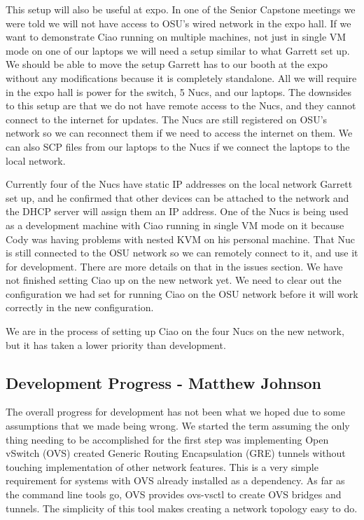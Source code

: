 \documentclass[10pt,onecolumn,journal,draftclsnofoot]{IEEEtran}
\begin{document}
This setup will also be useful at expo.
In one of the Senior Capstone meetings we were told  we will not have access to
OSU's wired network in the expo hall. If we want
to demonstrate Ciao running on multiple machines, not just in single VM mode on
one of our laptops we will need a setup similar to what Garrett set up.
We should be able to move the setup Garrett has to our booth at the expo
without any modifications because it is completely standalone. All we will
require in the expo hall is power for the switch, 5 Nucs, and our laptops.
The downsides to this setup are that we do not have remote access to the Nucs,
and they cannot connect to the internet for updates. The Nucs are still
registered on OSU's network so we can reconnect them if we need to access the
internet on them. We can also SCP files from our laptops to the Nucs if we
connect the laptops to the local network.

Currently four of the Nucs have static IP addresses on the local network Garrett
set up, and he confirmed that other devices can be attached to the network and
the DHCP server will assign them an IP address. One of the Nucs is being used 
as a development machine with Ciao running in single VM mode on it because Cody
was having problems with nested KVM on his personal machine. That Nuc is still 
connected to the OSU network so we can remotely connect to it, and use it for 
development.
There are more details on that in the issues section.
We have not finished setting Ciao up on the new network yet. We need to
clear out the configuration we had set for running Ciao on the OSU network
before it will work correctly in the new configuration.

We are in the process of setting up Ciao on the four Nucs on the  new network,
but it has taken a lower priority than development.

\subsection{Development Progress - Matthew Johnson}

The overall progress for development has not been what we hoped due to some
assumptions that we made being wrong. We started the term assuming the only
thing needing to be accomplished for the first step was implementing Open
vSwitch (OVS) created Generic Routing Encapsulation (GRE) tunnels without
touching implementation of other network features. This is a very simple
requirement for systems with OVS already installed as a dependency. As far as
the command line tools go, OVS provides ovs-vsctl to create OVS bridges and
tunnels. The simplicity of this tool makes creating a network topology easy to
do.
\end{document}
